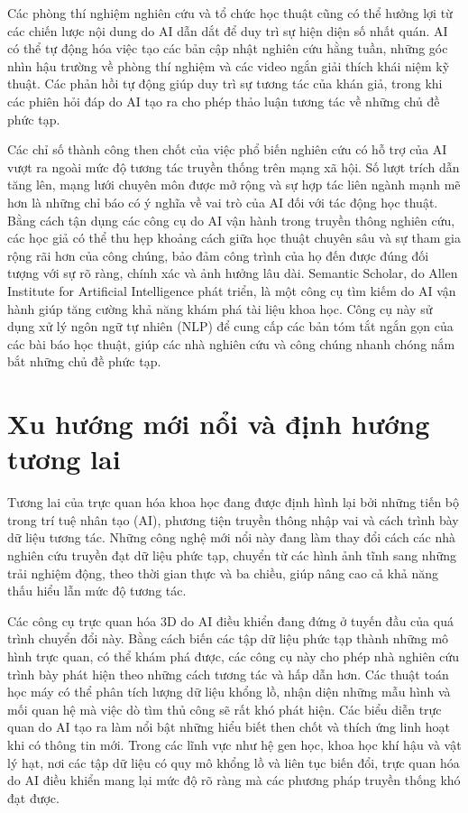 Các phòng thí nghiệm nghiên cứu và tổ chức học thuật cũng có thể hưởng lợi từ các chiến lược nội dung do AI dẫn dắt để duy trì sự hiện diện số nhất quán. AI có thể tự động hóa việc tạo các bản cập nhật nghiên cứu hằng tuần, những góc nhìn hậu trường về phòng thí nghiệm và các video ngắn giải thích khái niệm kỹ thuật. Các phản hồi tự động giúp duy trì sự tương tác của khán giả, trong khi các phiên hỏi đáp do AI tạo ra cho phép thảo luận tương tác về những chủ đề phức tạp.

Các chỉ số thành công then chốt của việc phổ biến nghiên cứu có hỗ trợ của AI vượt ra ngoài mức độ tương tác truyền thống trên mạng xã hội. Số lượt trích dẫn tăng lên, mạng lưới chuyên môn được mở rộng và sự hợp tác liên ngành mạnh mẽ hơn là những chỉ báo có ý nghĩa về vai trò của AI đối với tác động học thuật. Bằng cách tận dụng các công cụ do AI vận hành trong truyền thông nghiên cứu, các học giả có thể thu hẹp khoảng cách giữa học thuật chuyên sâu và sự tham gia rộng rãi hơn của công chúng, bảo đảm công trình của họ đến được đúng đối tượng với sự rõ ràng, chính xác và ảnh hưởng lâu dài. Semantic Scholar, do Allen Institute for Artificial Intelligence phát triển, là một công cụ tìm kiếm do AI vận hành giúp tăng cường khả năng khám phá tài liệu khoa học. Công cụ này sử dụng xử lý ngôn ngữ tự nhiên (NLP) để cung cấp các bản tóm tắt ngắn gọn của các bài báo học thuật, giúp các nhà nghiên cứu và công chúng nhanh chóng nắm bắt những chủ đề phức tạp.

\section{Xu hướng mới nổi và định hướng tương lai}

Tương lai của trực quan hóa khoa học đang được định hình lại bởi những tiến bộ trong trí tuệ nhân tạo (AI), phương tiện truyền thông nhập vai và cách trình bày dữ liệu tương tác. Những công nghệ mới nổi này đang làm thay đổi cách các nhà nghiên cứu truyền đạt dữ liệu phức tạp, chuyển từ các hình ảnh tĩnh sang những trải nghiệm động, theo thời gian thực và ba chiều, giúp nâng cao cả khả năng thấu hiểu lẫn mức độ tương tác.

Các công cụ trực quan hóa 3D do AI điều khiển đang đứng ở tuyến đầu của quá trình chuyển đổi này. Bằng cách biến các tập dữ liệu phức tạp thành những mô hình trực quan, có thể khám phá được, các công cụ này cho phép nhà nghiên cứu trình bày phát hiện theo những cách tương tác và hấp dẫn hơn. Các thuật toán học máy có thể phân tích lượng dữ liệu khổng lồ, nhận diện những mẫu hình và mối quan hệ mà việc dò tìm thủ công sẽ rất khó phát hiện. Các biểu diễn trực quan do AI tạo ra làm nổi bật những hiểu biết then chốt và thích ứng linh hoạt khi có thông tin mới. Trong các lĩnh vực như hệ gen học, khoa học khí hậu và vật lý hạt, nơi các tập dữ liệu có quy mô khổng lồ và liên tục biến đổi, trực quan hóa do AI điều khiển mang lại mức độ rõ ràng mà các phương pháp truyền thống khó đạt được.

